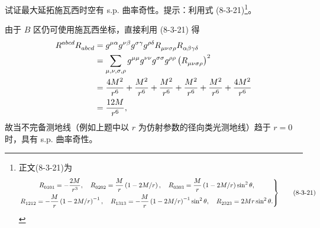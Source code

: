 \begin{xiti}
	\item 试证最大延拓施瓦西时空有 s.p. 曲率奇性。提示：利用式 (8-3-21)\footnote{正文(8-3-21)为
	\begin{equation}
		\left.
			\begin{gathered}
				\tensor{R}{_0_1_0_1} = -\frac{2M}{r^3} \qc \tensor{R}{_0_2_0_2} = \frac{M}{r} \left( 1 - 2M/r \right) \qc \tensor{R}{_0_3_0_3} = \frac{M}{r}\left( 1 - 2M/r \right) \sin^2\theta,\\
				\tensor{R}{_1_2_1_2} = - \frac{M}{r} \left( 1 - 2M/r \right)^{-1} \qc \tensor{R}{_1_3_1_3} = - \frac{M}{r} \left( 1 - 2M/r \right)^{-1} \sin^2 \theta \qc \tensor{R}{_2_3_2_3} = 2 M r \sin^2 \theta.
			\end{gathered}
		\right\}
		\tag{8-3-21}
	\end{equation}}。
	\begin{zm}
		由于 $B$ 区仍可使用施瓦西坐标，直接利用 (8-3-21) 得
		\begin{align*}
			\tensor{R}{^a^b^c^d} \tensor{R}{_a_b_c_d} &= \tensor{g}{^\mu^\alpha} \tensor{g}{^\nu^\beta} \tensor{g}{^\sigma^\gamma} \tensor{g}{^\rho^\delta} \tensor{R}{_\mu_\nu_\sigma_\rho} \tensor{R}{_\alpha_\beta_\gamma_\delta}\\
			&= \sum_{\mu,\nu,\sigma,\rho} \tensor{g}{^\mu^\mu} \tensor{g}{^\nu^\nu} \tensor{g}{^\sigma^\sigma} \tensor{g}{^\rho^\rho} \left( \tensor{R}{_\mu_\nu_\sigma_\rho} \right)^2\\
			&= \frac{4M^2}{r^6} + \frac{M^2}{r^6} + \frac{M^2}{r^6} + \frac{M^2}{r^6} + \frac{M^2}{r^6} + \frac{4M^2}{r^6}\\
			&= \frac{12 M}{r^6},
		\end{align*}
		故当不完备测地线（例如上题中以 $r$ 为仿射参数的径向类光测地线）趋于 $r=0$ 时，具有 s.p. 曲率奇性。
	\end{zm}
\end{xiti}
